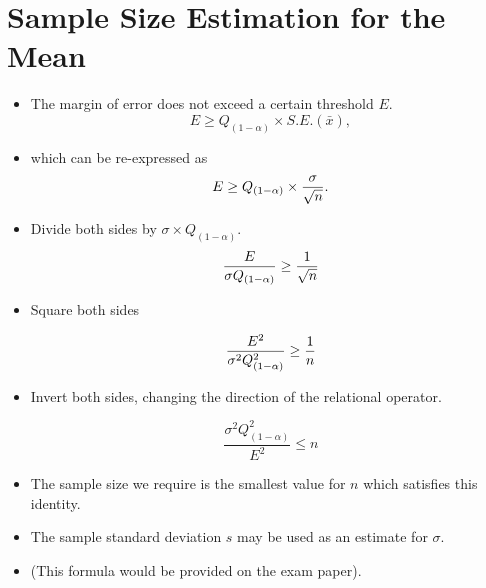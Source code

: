 \documentclass[]{report}
\begin{document}
\section{Sample Size Estimation for the Mean}



\begin{itemize}

\item The margin of error does not exceed a certain threshold $E$.
\[ E \geq Q_{(1-\alpha)} \times S.E.(\bar{x}), \]

\item which can be re-expressed as
\[E \geq Q_{(1-\alpha)} \times {\sigma \over \sqrt{n} }.\]

\item Divide both sides by $\sigma \times Q_{(1-\alpha)}$.
\[ \frac{E}{\sigma Q_{(1-\alpha)}} \geq {1 \over \sqrt{n} } \]

\item Square both sides

\[ \frac{E^2}{\sigma^2 Q_{(1-\alpha)}^2} \geq {1 \over n } \]



\item Invert both sides, changing the direction of the relational operator.

\[ \frac{\sigma^2 Q^2_{(1-\alpha)}}{E^2} \leq n \]
\end{itemize}


\begin{itemize}
\item The sample size we require is the smallest value for $n$ which satisfies this identity.
\item The sample standard deviation $s$ may be used as an estimate for $\sigma$.
\item (This formula would be provided on the exam paper).
\end{itemize}




\end{document}
